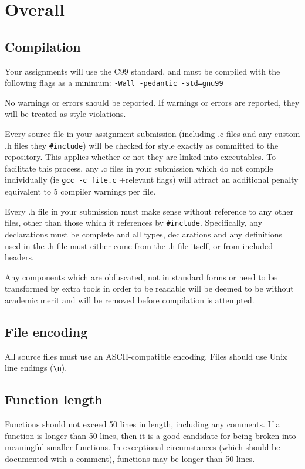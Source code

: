 \documentclass{article}
\begin{document}
\section{Overall}
\subsection{Compilation}
Your assignments will use the C99 standard, and must be compiled with the following flags as a minimum: \texttt{-Wall -pedantic -std=gnu99}

No warnings or errors should be reported.
If warnings or errors are reported, they will be treated as style violations.

Every source file in your assignment submission (including .c files and any custom .h files they \texttt{\#include}) will be checked for style exactly as committed to the repository.
This applies whether or not they are linked into executables.
To facilitate this process, any .c files in your submission which do not compile individually (ie \texttt{gcc -c file.c} +relevant flags) will attract an additional penalty equivalent to 5 compiler warnings per file.

Every .h file in your submission must make sense without reference to any other files, other than those which it references by \texttt{\#include}.
Specifically, any declarations must be complete and all types, declarations and any definitions used in the .h file must either come from the .h file itself, or from included headers.

Any components which are obfuscated, not in standard forms or need to be transformed by extra tools in order to be readable will be deemed to be without academic merit and will be removed before compilation is attempted.

\subsection{File encoding}
All source files must use an ASCII-compatible encoding. 
Files should use Unix line endings (\texttt{\textbackslash n}).

\subsection{Function length}
Functions should not exceed 50 lines in length, including any comments.
If a function is longer than 50 lines, then it is a good candidate for being broken into meaningful smaller functions.
In exceptional circumstances (which should be documented with a comment), functions may be longer than 50 lines.
\end{document}
